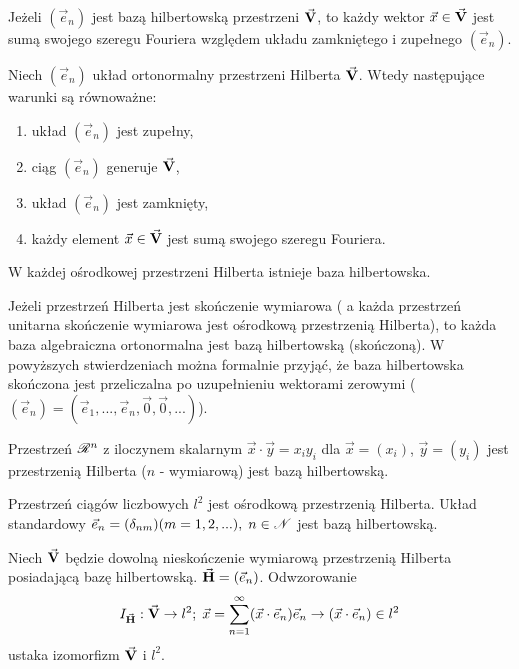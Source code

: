 \begin{info}
   Jeżeli $(\vec{e}_n)$ jest bazą hilbertowską przestrzeni $\vec{\mathbf{V}}$, to każdy wektor $\vec{x} \in \vec{\mathbf{V}}$ jest sumą swojego szeregu Fouriera względem układu zamkniętego i zupełnego $(\vec{e}_n)$. 
\end{info}

\begin{tw}
   Niech $(\vec{e}_n)$ układ ortonormalny przestrzeni Hilberta $\vec{\mathbf{V}}$. Wtedy następujące warunki są równoważne:
   \begin{enumerate}
    \item układ $(\vec{e}_n)$ jest zupełny,
    \item ciąg $(\vec{e}_n)$ generuje $\vec{\mathbf{V}}$,
    \item układ $(\vec{e}_n)$ jest zamknięty,
    \item każdy element $\vec{x} \in \vec{\mathbf{V}}$ jest sumą swojego szeregu Fouriera.
   \end{enumerate}
\end{tw}

\begin{tw}
   W każdej ośrodkowej przestrzeni Hilberta istnieje baza hilbertowska.
\end{tw}

\begin{info}
   Jeżeli przestrzeń Hilberta jest skończenie wymiarowa ( a każda przestrzeń unitarna skończenie wymiarowa jest ośrodkową przestrzenią Hilberta), to każda baza algebraiczna ortonormalna jest bazą hilbertowską (skończoną). W powyższych stwierdzeniach można formalnie przyjąć, że baza hilbertowska skończona jest przeliczalna po uzupełnieniu wektorami zerowymi ($(\vec{e}_n) = (\vec{e}_1, ..., \vec{e}_n, \vec{0}, \vec{0}, ...)$).
\end{info}

\begin{example}
   Przestrzeń $\mathscr{R}^n$ z iloczynem skalarnym $\vec{x} \cdot \vec{y} = x_i y_i$ dla $\vec{x} = (x_i)$, $\vec{y} = (y_i)$ jest przestrzenią Hilberta ($n$ - wymiarową) jest bazą hilbertowską.
\end{example}

\begin{example}
   Przestrzeń ciągów liczbowych $l^2$ jest ośrodkową przestrzenią Hilberta. Układ standardowy $\vec{e}_n = (\delta_{nm}) (m=1,2,...), \; n \in \mathscr{N}$ jest bazą hilbertowską.
   
   Niech $\vec{\mathbf{V}}$ będzie dowolną nieskończenie wymiarową przestrzenią Hilberta posiadającą bazę hilbertowską. $\vec{\mathbf{H}} = (\vec{e}_n)$. Odwzorowanie
   \[I_{\vec{\mathbf{H}}}: \vec{\mathbf{V}} \to l^2;\; \vec{x} = \sum\limits_{n=1}^{\infty} (\vec{x}\cdot \vec{e}_n) \vec{e}_n \to (\vec{x} \cdot \vec{e}_n) \in l^2\]
   ustaka izomorfizm $\vec{\mathbf{V}}$ i $l^2$.
\end{example}

